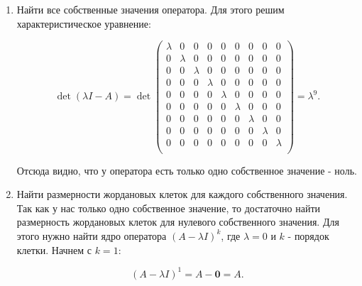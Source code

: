 \begin{enumerate}

    \item Найти все собственные значения оператора.
    Для этого решим характеристическое уравнение:

    \[
        \det(\lambda I - A) = \det \begin{pmatrix}
                                       \lambda & 0       & 0       & 0       & 0       & 0       & 0       & 0       & 0       \\
                                       0       & \lambda & 0       & 0       & 0       & 0       & 0       & 0       & 0       \\
                                       0       & 0       & \lambda & 0       & 0       & 0       & 0       & 0       & 0       \\
                                       0       & 0       & 0       & \lambda & 0       & 0       & 0       & 0       & 0       \\
                                       0       & 0       & 0       & 0       & \lambda & 0       & 0       & 0       & 0       \\
                                       0       & 0       & 0       & 0       & 0       & \lambda & 0       & 0       & 0       \\
                                       0       & 0       & 0       & 0       & 0       & 0       & \lambda & 0       & 0       \\
                                       0       & 0       & 0       & 0       & 0       & 0       & 0       & \lambda & 0       \\
                                       0       & 0       & 0       & 0       & 0       & 0       & 0       & 0       & \lambda \\
        \end{pmatrix} = \lambda^9.
    \]

    Отсюда видно, что у оператора есть только одно собственное значение - ноль.
    \item Найти размерности жордановых клеток для каждого собственного значения.
    Так как у нас только одно
    собственное значение, то достаточно найти размерность жордановых клеток для нулевого собственного значения.
    Для этого нужно найти ядро оператора $(A - \lambda I)^k$, где $\lambda = 0$ и $k$ - порядок клетки.
    Начнем с $k=1$:

    \[ (A - \lambda I)^1 = A - \mathbf{0} = A. \]


\end{enumerate}
